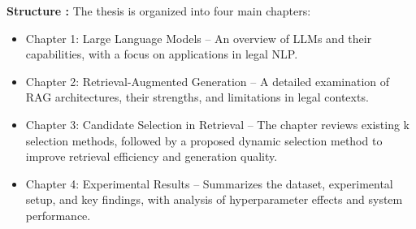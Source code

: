 \textbf{Structure :} 
The thesis is organized into four main chapters: 
\begin{itemize}
	\item Chapter 1: Large Language Models – An overview of LLMs and their capabilities, with a focus on applications in legal NLP.
	
	\item Chapter 2: Retrieval-Augmented Generation – A detailed examination of RAG architectures, their strengths, and limitations in legal contexts.

	\item Chapter 3: Candidate Selection in Retrieval – The chapter reviews existing k selection methods, followed by a proposed dynamic selection method to improve retrieval efficiency and generation quality.

	\item Chapter 4: Experimental Results – Summarizes the dataset, experimental setup, and key findings, with analysis of hyperparameter effects and system performance.
\end{itemize}

